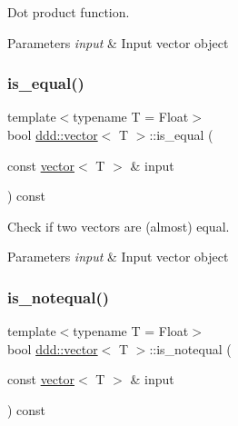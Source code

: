Dot product function. 


\begin{DoxyParams}{Parameters}
{\em input} & Input vector object \\
\hline
\end{DoxyParams}
\mbox{\label{classddd_1_1vector_a860847a7c7c93e52b4a83af722eb60f7}} 
\subsubsection{\texorpdfstring{is\+\_\+equal()}{is\_equal()}}
{\footnotesize\ttfamily template$<$typename T = Float$>$ \\
bool \hyperlink{classddd_1_1vector}{ddd\+::vector}$<$ T $>$\+::is\+\_\+equal (\begin{DoxyParamCaption}\item[{const \hyperlink{classddd_1_1vector}{vector}$<$ T $>$ \&}]{input }\end{DoxyParamCaption}) const\hspace{0.3cm}{\ttfamily [inline]}}



Check if two vectors are (almost) equal. 


\begin{DoxyParams}{Parameters}
{\em input} & Input vector object \\
\hline
\end{DoxyParams}
\mbox{\label{classddd_1_1vector_a73bf080395fbbdf9642cf5440d699013}} 
\subsubsection{\texorpdfstring{is\+\_\+notequal()}{is\_notequal()}}
{\footnotesize\ttfamily template$<$typename T = Float$>$ \\
bool \hyperlink{classddd_1_1vector}{ddd\+::vector}$<$ T $>$\+::is\+\_\+notequal (\begin{DoxyParamCaption}\item[{const \hyperlink{classddd_1_1vector}{vector}$<$ T $>$ \&}]{input }\end{DoxyParamCaption}) const\hspace{0.3cm}{\ttfamily [inline]}}



